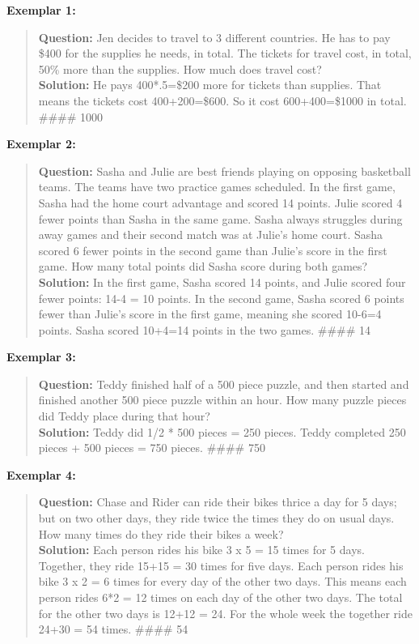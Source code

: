 \documentclass{article}
\begin{document}
\noindent\textbf{Exemplar 1:}
\begin{quote}
\small
\textbf{Question:} Jen decides to travel to 3 different countries. He has to pay \$400 for the supplies he needs, in total. The tickets for travel cost, in total, 50\% more than the supplies. How much does travel cost? \\
\textbf{Solution:} He pays 400*.5=\$200 more for tickets than supplies. That means the tickets cost 400+200=\$600. So it cost 600+400=\$1000 in total. \#\#\#\# 1000
\end{quote}

\noindent\textbf{Exemplar 2:}
\begin{quote}
\small
\textbf{Question:} Sasha and Julie are best friends playing on opposing basketball teams. The teams have two practice games scheduled. In the first game, Sasha had the home court advantage and scored 14 points. Julie scored 4 fewer points than Sasha in the same game. Sasha always struggles during away games and their second match was at Julie's home court. Sasha scored 6 fewer points in the second game than Julie's score in the first game. How many total points did Sasha score during both games? \\
\textbf{Solution:} In the first game, Sasha scored 14 points, and Julie scored four fewer points: 14-4 = 10 points. In the second game, Sasha scored 6 points fewer than Julie's score in the first game, meaning she scored 10-6=4 points. Sasha scored 10+4=14 points in the two games. \#\#\#\# 14
\end{quote}

\noindent\textbf{Exemplar 3:}
\begin{quote}
\small
\textbf{Question:} Teddy finished half of a 500 piece puzzle, and then started and finished another 500 piece puzzle within an hour. How many puzzle pieces did Teddy place during that hour? \\
\textbf{Solution:} Teddy did 1/2 * 500 pieces = 250 pieces. Teddy completed 250 pieces + 500 pieces = 750 pieces. \#\#\#\# 750
\end{quote}

\noindent\textbf{Exemplar 4:}
\begin{quote}
\small
\textbf{Question:} Chase and Rider can ride their bikes thrice a day for 5 days; but on two other days, they ride twice the times they do on usual days. How many times do they ride their bikes a week? \\
\textbf{Solution:} Each person rides his bike 3 x 5 = 15 times for 5 days. Together, they ride 15+15 = 30 times for five days. Each person rides his bike 3 x 2 = 6 times for every day of the other two days. This means each person rides 6*2 = 12 times on each day of the other two days. The total for the other two days is 12+12 = 24. For the whole week the together ride 24+30 = 54 times. \#\#\#\# 54
\end{quote}
\end{document}
